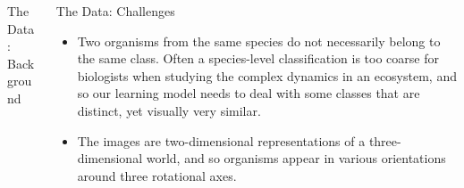 \documentclass[final,hyperref={pdfpagelabels=false}]{beamer}
\begin{document}
\begin{frame}
\begin{columns}[T]
\begin{column}{.32\textwidth}
\begin{block}{The Data: Background}
\begin{figure}
\begin{minipage}{.5\textwidth}

        \end{minipage}
        \end{figure}	

      \end{block}
    \end{column}

  	\begin{column}{.32\textwidth}
      \begin{block}{The Data: Challenges}
        \begin{itemize}
          \item Two organisms from the same species do not necessarily belong to the same class.  Often a species-level classification
            is too coarse for biologists when studying the complex dynamics in an ecosystem, and so our learning model
            needs to deal with some classes that are distinct, yet visually very similar.
          \item The images are two-dimensional representations of a three-dimensional world, and so organisms appear in various
            orientations around three rotational axes.
        \end{itemize}
      \end{block}


\end{column}
\end{columns}
\end{frame}
\end{document}
